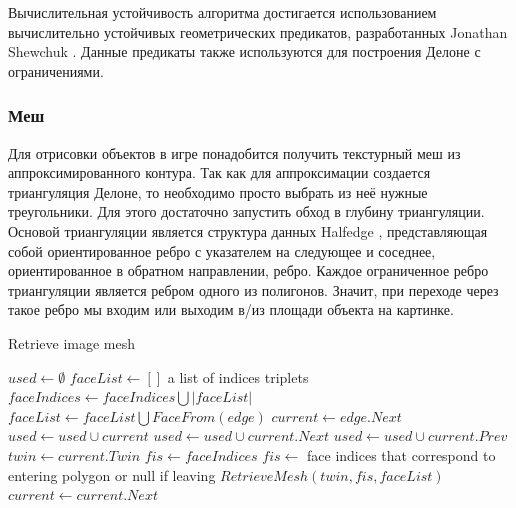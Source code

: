 \documentclass{fefu_thesis/cls/fefu}
\newenvironment{algo}[1][]
  {\begin{algorithm}[#1]
     \selectlanguage{english}
     \floatname{algorithm}{Алгоритм}
  }
  {\end{algorithm}}
\begin{document}
    Вычислительная устойчивость алгоритма достигается использованием вычислительно устойчивых геометрических предикатов, разработанных Jonathan\\Shewchuk \cite{shewchuk97a}. Данные предикаты также используются для построения Делоне с ограничениями.

    \subsubsection{Меш}

    Для отрисовки объектов в игре понадобится получить текстурный меш из аппроксимированного контура. Так как для аппроксимации создается триангуляция Делоне, то необходимо просто выбрать из неё нужные треугольники. Для этого достаточно запустить обход в глубину триангуляции. Основой триангуляции является структура данных Halfedge \cite{Halfedge}, представляющая собой ориентированное ребро с указателем на следующее и соседнее, ориентированное в обратном направлении, ребро. Каждое ограниченное ребро триангуляции является ребром одного из полигонов. Значит, при переходе через такое ребро мы входим или выходим в/из площади объекта на картинке.

    \begin{algo}[H]
        \caption{Retrieve image mesh}
        \begin{algorithmic}[1]
            \State $used \gets \emptyset$
            \State $faceList \gets []$ a list of indices triplets
                 
                    \State $faceIndices \gets faceIndices \bigcup \left|faceList\right|$
                    \State $faceList \gets faceList \bigcup FaceFrom\left(edge\right)$
                \EndIf
                \State $current \gets edge.Next$
                \State $used \gets used \cup current$
                \State $used \gets used \cup current.Next$
                \State $used \gets used \cup current.Prev$
                 
                        \State $twin \gets current.Twin$
                        \State $fis \gets faceIndices$
                         
                            \State $fis \gets $ face indices that correspond to entering polygon or null if leaving
                        \EndIf
                        \State $RetrieveMesh(twin, fis, faceList)$
                    \EndIf
                \EndWhile
                \State $current \gets current.Next$
            \EndProcedure
        \end{algorithmic}
    \end{algo}
\end{document}
